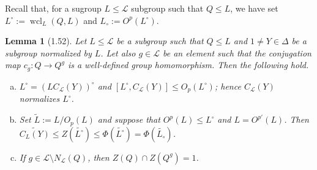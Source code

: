 \documentclass{amsart}
\numberwithin{equation}{section}
\newtheorem{lemma}[equation]{Lemma}
\theoremstyle{definition}
\theoremstyle{subresult}
\theoremstyle{caseresult}
\renewcommand{\L}{\mathcal{L}}
\newcommand{\wcl}{\operatorname{wcl}}
\newcommand{\wde}{\widetilde}
\newcommand{\fto}{\longrightarrow}
\newcommand{\<}{\langle}
\renewcommand{\>}{\rangle}
\begin{document}
Recall that, for a sugroup $L \le \L$ subgroup such that $Q \le L$, we have set $L^\circ:= \wcl_L(Q,L)$ and $L_\circ := O^p(L^\circ)$.

\begin{lemma}[1.52]\label{lemma: L containing Q}
	Let $L \le \L$ be a subgroup such that $Q \le L$ and $1 \ne Y \in \Delta$ be a subgroup normalized by $L$. Let also $g \in \L$ be an element such that the conjugation map $c_g \colon Q \fto Q^g$ is a well-defined group homomorphism. Then the following hold.
	\begin{enumerate}[(a)]
		\item $L^\circ = (LC_\L(Y))^\circ$ and $[L^\circ, C_\L(Y)] \le O_p(L^\circ)$; hence $C_\L(Y)$ normalizes $L^\circ$.
		\item Set $\wde{L}:=L / O_p(L)$ and suppose that $O^p(L) \le L^\circ$ and $L=O^{p'}(L)$. Then $\wde{C_L(Y)} \le Z(\wde{L^\circ}) \le \Phi(\wde{L^\circ}) = \Phi(\wde{L_\circ})$.
		\item If $g \in \L \setminus N_\L(Q)$, then $Z(Q) \cap Z(Q^g) = 1$.
	\end{enumerate}
\end{lemma}
\end{document}
